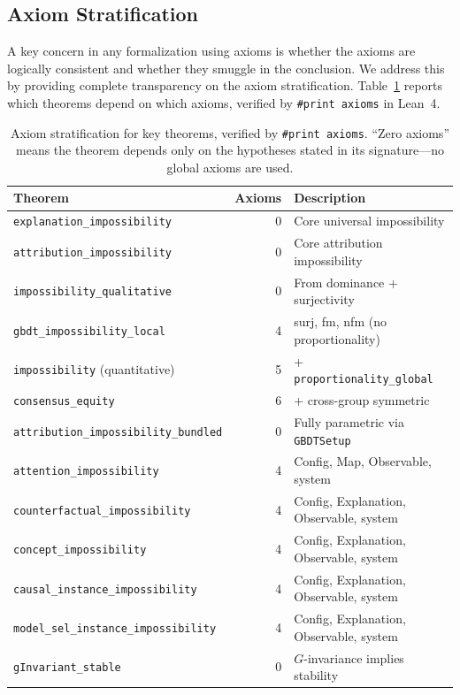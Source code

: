 \documentclass[11pt,a4paper]{article}
\begin{document}
\subsection{Axiom Stratification}
\label{sec:axiom-stratification}

A key concern in any formalization using axioms is whether the axioms are
logically consistent and whether they smuggle in the conclusion.  We address
this by providing complete transparency on the axiom stratification.
Table~\ref{tab:axiom-strat} reports which theorems depend on which axioms,
verified by \texttt{\#print axioms} in Lean~4.

\begin{table}[ht]
\centering
\caption{Axiom stratification for key theorems, verified by \texttt{\#print axioms}.
  ``Zero axioms'' means the theorem depends only on the hypotheses stated in its
  signature---no global axioms are used.}
\label{tab:axiom-strat}
\footnotesize
\begin{tabular}{@{}lrl@{}}
\toprule
Theorem & Axioms & Description \\
\midrule
\texttt{explanation\_impossibility} & 0 & Core universal impossibility \\
\texttt{attribution\_impossibility} & 0 & Core attribution impossibility \\
\texttt{impossibility\_qualitative} & 0 & From dominance + surjectivity \\
\texttt{gbdt\_impossibility\_local} & 4 & surj, fm, nfm (no proportionality) \\
\texttt{impossibility} (quantitative) & 5 & + \texttt{proportionality\_global} \\
\texttt{consensus\_equity} & 6 & + cross-group symmetric \\
\texttt{attribution\_impossibility\_bundled} & 0 & Fully parametric via \texttt{GBDTSetup} \\
\texttt{attention\_impossibility} & 4 & Config, Map, Observable, system \\
\texttt{counterfactual\_impossibility} & 4 & Config, Explanation, Observable, system \\
\texttt{concept\_impossibility} & 4 & Config, Explanation, Observable, system \\
\texttt{causal\_instance\_impossibility} & 4 & Config, Explanation, Observable, system \\
\texttt{model\_sel\_instance\_impossibility} & 4 & Config, Explanation, Observable, system \\
\texttt{gInvariant\_stable} & 0 & $G$-invariance implies stability \\

\end{tabular}
\end{table}
\end{document}
